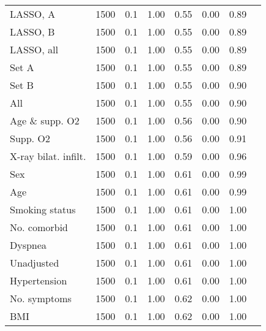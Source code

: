 \documentclass{article}
\begin{document}
{\begin{longtable}{lccccccc}
LASSO, A & 1500 & 0.1 & 1.00 & 0.55 & 0.00 & 0.89\\
LASSO, B & 1500 & 0.1 & 1.00 & 0.55 & 0.00 & 0.89\\
LASSO, all & 1500 & 0.1 & 1.00 & 0.55 & 0.00 & 0.89\\
Set A & 1500 & 0.1 & 1.00 & 0.55 & 0.00 & 0.89\\
Set B & 1500 & 0.1 & 1.00 & 0.55 & 0.00 & 0.90\\
All & 1500 & 0.1 & 1.00 & 0.55 & 0.00 & 0.90\\
Age \& supp. O2 & 1500 & 0.1 & 1.00 & 0.56 & 0.00 & 0.90\\
Supp. O2 & 1500 & 0.1 & 1.00 & 0.56 & 0.00 & 0.91\\
X-ray bilat. infilt. & 1500 & 0.1 & 1.00 & 0.59 & 0.00 & 0.96\\
Sex & 1500 & 0.1 & 1.00 & 0.61 & 0.00 & 0.99\\
Age & 1500 & 0.1 & 1.00 & 0.61 & 0.00 & 0.99\\
Smoking status & 1500 & 0.1 & 1.00 & 0.61 & 0.00 & 1.00\\
No. comorbid & 1500 & 0.1 & 1.00 & 0.61 & 0.00 & 1.00\\
Dyspnea & 1500 & 0.1 & 1.00 & 0.61 & 0.00 & 1.00\\
Unadjusted & 1500 & 0.1 & 1.00 & 0.61 & 0.00 & 1.00\\
Hypertension & 1500 & 0.1 & 1.00 & 0.61 & 0.00 & 1.00\\
No. symptoms & 1500 & 0.1 & 1.00 & 0.62 & 0.00 & 1.00\\
BMI & 1500 & 0.1 & 1.00 & 0.62 & 0.00 & 1.00\\
\bottomrule
\hline
\end{longtable}
}

\clearpage
\end{document}

